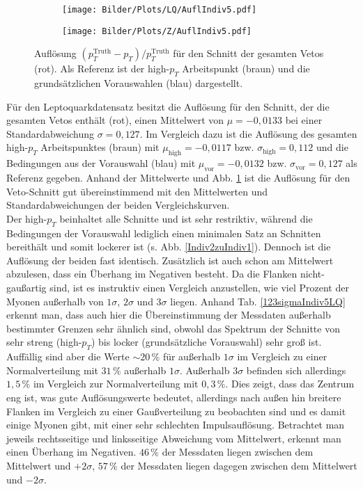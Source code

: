 \begin{figure}
  \begin{subfigure}[t]{0.55\textwidth}
  \texttt{[image: Bilder/Plots/LQ/AuflIndiv5.pdf]}
  \label{AuflIndiv5LQ}
  \end{subfigure}
\begin{subfigure}[t]{0.55\textwidth}
 \texttt{[image: Bilder/Plots/Z/AuflIndiv5.pdf]}
  \label{AuflIndiv5Z}
\end{subfigure}
\caption{Auflösung $(p_T^{\text{Truth}}-p_T)/p_T^{\text{Truth}}$ für den Schnitt der gesamten Vetos (rot). Als Referenz ist der high-$p_T$ Arbeitspunkt (braun) und die grundsätzlichen Vorauswahlen (blau) dargestellt.}
\label{AuflIndiv5}
\end{figure}  
Für den Leptoquarkdatensatz besitzt die Auflösung für den Schnitt, der die gesamten Vetos enthält (rot), einen Mittelwert von $\mu=-0,0133$ bei einer Standardabweichung $\sigma= 0,127$. Im Vergleich dazu ist die Auflösung des gesamten high-$p_T$ Arbeitspunktes (braun) mit $\mu_{\text{high}}=-0,0117$ bzw. $\sigma_{\text{high}}=0,112$ und die Bedingungen aus der Vorauswahl (blau) mit $\mu_{\text{vor}}=-0,0132$ bzw. $\sigma_{\text{vor}}=0,127$ als Referenz gegeben. Anhand der Mittelwerte und Abb. \ref{AuflIndiv5LQ} ist die Auflösung für den Veto-Schnitt gut übereinstimmend mit den Mittelwerten und Standardabweichungen der beiden Vergleichskurven.\\
Der high-$p_T$ beinhaltet alle Schnitte und ist sehr restriktiv, während die Beding\-ungen der Vorauswahl lediglich einen minimalen Satz an Schnitten bereithält und somit lockerer ist (s. Abb. \ref{Indiv2zuIndiv1}). Dennoch ist die Auflösung der beiden fast identisch. Zusätzlich ist auch schon am Mittelwert abzulesen, dass ein Überhang im Negativen besteht.
Da die Flanken nicht-gaußartig sind, ist es instruktiv einen Vergleich anzustellen, wie viel Prozent der Myonen außerhalb von $1\sigma$, $2\sigma$ und $3\sigma$ liegen. Anhand Tab. \ref{123sigmaIndiv5LQ} erkennt man, dass auch hier die Übereinstimmung der Messdaten außerhalb bestimmter Grenzen sehr ähnlich sind, obwohl das Spektrum der Schnitte von sehr streng (high-$p_T$) bis locker (grundsätzliche Vorauswahl) sehr groß ist. Auffällig sind aber die Werte $\sim20\,\%$ für außerhalb $1\sigma$ im Vergleich zu einer Normalverteilung mit $31\,\%$ außerhalb $1\sigma$. Außerhalb $3\sigma$ befinden sich allerdings $1,5\,\%$ im Vergleich zur Normalverteilung mit $0,3\,\%$. Dies zeigt, dass das Zentrum eng ist, was gute Auflösungswerte bedeutet, allerdings nach außen hin breitere Flanken im Vergleich zu einer Gaußverteilung zu beobachten sind und es damit einige Myonen gibt, mit einer sehr schlechten Impulsauflösung. Betrachtet man jeweils rechtsseitige und linksseitige Abweichung vom Mittelwert, erkennt man einen Überhang im Negativen. $46\,\%$ der Messdaten liegen zwischen dem Mittelwert und $+2\sigma$, $57\,\%$ der Messdaten liegen dagegen zwischen dem Mittelwert und $-2\sigma$.\\
